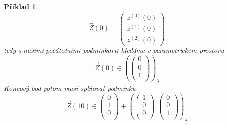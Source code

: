 \documentclass{article}
\newtheorem{example}{Příklad}
\begin{document}
\begin{example}
\begin{equation}
        \vec{Z}(0) = 
        \begin{pmatrix}
            z^{(0)}(0)\\
            z^{(1)}(0) \\
            z^{(2)}(0)
        \end{pmatrix} 
    \end{equation}
    tedy s našimi počátečními podmínkami hledáme v parametrickém prostoru
    \begin{equation}
        \vec{Z}(0) \in \left( 
            \begin{pmatrix}
                0 \\
                0 \\
                1 \\
            \end{pmatrix}
            \right)_{\lambda}
        \end{equation}
        Koncový bod potom musí splňovat podmínku 
        \begin{equation}
            \vec{Z}(10) \in 
            \begin{pmatrix}
                0 \\
                1 \\
                0 \\
            \end{pmatrix}  + 
            \left( 
                \begin{pmatrix} 
                    1 \\
                    0 \\
                    0 \\
                \end{pmatrix},
                \begin{pmatrix} 
                    0 \\
                    0 \\
                    1 \\
                \end{pmatrix}
            \right)_{\lambda}
        \end{equation}
    \end{example}
\end{document}
